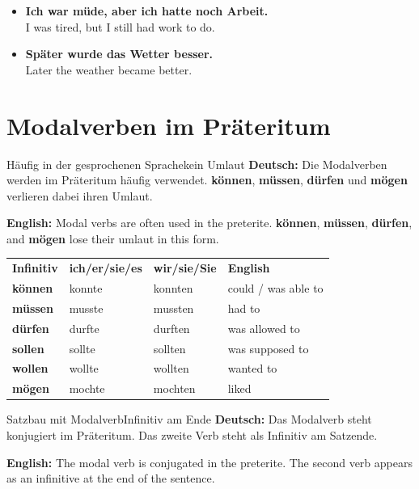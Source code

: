 \documentclass[a4paper,11pt]{article}
\newcommand{\GermanText}[1]{\textbf{Deutsch: }#1\par}
\newcommand{\EnglishText}[1]{{\small\color{SoftGray}\textbf{English: }#1\par}}
\newcommand{\ExampleItem}[2]{\item \textbf{#1}\\{\small\color{SoftGray}#2}}
\begin{document}
        \begin{exbox}
            \begin{itemize}
                \ExampleItem{Ich war müde, aber ich hatte noch Arbeit.}{I was tired, but I still had work to do.}
                \ExampleItem{Später wurde das Wetter besser.}{Later the weather became better.}
            \end{itemize}
        \end{exbox}
    
    
    \section{Modalverben im Präteritum}
        
        \begin{grammarentry}{Häufig in der gesprochenen Sprache}{kein Umlaut}
            \GermanText{Die Modalverben werden im Präteritum häufig verwendet. \textbf{können}, \textbf{müssen}, \textbf{dürfen} und \textbf{mögen} verlieren dabei ihren Umlaut.}
            \EnglishText{Modal verbs are often used in the preterite. \textbf{können}, \textbf{müssen}, \textbf{dürfen}, and \textbf{mögen} lose their umlaut in this form.}
        \end{grammarentry}
        
        \begin{longtable}{>{\bfseries}p{2.6cm}|p{2.8cm}|p{3.3cm}|p{4.4cm}}
            \rowcolor{HeaderBlueDark}
            \color{white}\textbf{Infinitiv} &
            \color{white}\textbf{ich/er/sie/es} &
            \color{white}\textbf{wir/sie/Sie} &
            \color{white}\textbf{English} \\
            können & konnte & konnten & could / was able to \\
            müssen & musste & mussten & had to \\
            dürfen & durfte & durften & was allowed to \\
            sollen & sollte & sollten & was supposed to \\
            wollen & wollte & wollten & wanted to \\
            mögen & mochte & mochten & liked \\
        \end{longtable}
        
        \begin{grammarentry}{Satzbau mit Modalverb}{Infinitiv am Ende}
            \GermanText{Das Modalverb steht konjugiert im Präteritum. Das zweite Verb steht als Infinitiv am Satzende.}
            \EnglishText{The modal verb is conjugated in the preterite. The second verb appears as an infinitive at the end of the sentence.}
        \end{grammarentry}
        
\end{document}
